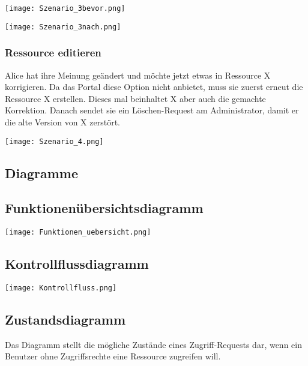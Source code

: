 \documentclass[parskip=full,11pt]{scrartcl}
\begin{document}
	\begin{center}
	\texttt{[image: Szenario\_3bevor.png]}
	
	\texttt{[image: Szenario\_3nach.png]}
	\end{center}

\subsubsection*{Ressource editieren}
Alice hat ihre Meinung geändert und möchte jetzt etwas in Ressource X korrigieren. Da das Portal diese Option nicht anbietet, muss sie zuerst erneut die Ressource X erstellen. Dieses mal beinhaltet X aber auch die gemachte Korrektion. Danach sendet sie ein Löschen-Request am Administrator, damit er die alte Version von X zerstört.\\
	
	\begin{center}
	\texttt{[image: Szenario\_4.png]}
	\end{center}
	
\subsection{Diagramme}

\subsection*{Funktionenübersichtsdiagramm}

	\begin{center}
	\texttt{[image: Funktionen\_uebersicht.png]}
	\end{center}
	
\subsection*{Kontrollflussdiagramm \grqq}

	\begin{center}
	\texttt{[image: Kontrollfluss.png]}
	\end{center}
	
\subsection*{Zustandsdiagramm \grqq}
Das Diagramm stellt die mögliche Zustände eines Zugriff-Requests dar, wenn ein Benutzer ohne Zugriffsrechte eine Ressource zugreifen will.
\\
\end{document}

